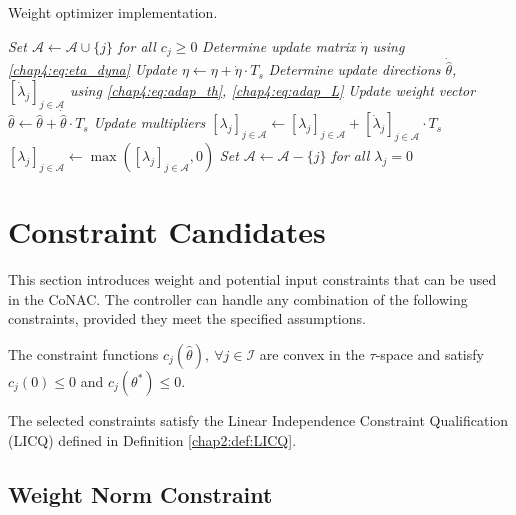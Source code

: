 \begin{algorithm}[t]
    \caption{Weight optimizer implementation.}\label{chap4:alg:alg1}
        \BlankLine
        \emph{Set $\mathcal A \leftarrow \mathcal A\cup \{j\}$ for all $c_j\ge0$}\;
        \emph{Determine update matrix $\dot\eta$ using \eqref{chap4:eq:eta_dyna}}\;
        \emph{Update $\eta\leftarrow \eta +\dot\eta\cdot T_s$}\; 
        \emph{Determine update directions $\dot{\hat\theta}$, $[\dot\lambda_j]_{j\in\mathcal A}$ using \eqref{chap4:eq:adap_th}, \eqref{chap4:eq:adap_L}}\;
        \emph{Update weight vector $\hat\theta\leftarrow \hat\theta+\dot{\hat\theta}\cdot T_s$}\;
        \emph{Update multipliers $[\lambda_j]_{j\in\mathcal A}\leftarrow [\lambda_j]_{j\in\mathcal A}+[\dot\lambda_j]_{j\in\mathcal A}\cdot T_s$}\;
        \emph{$[\lambda_j]_{j\in\mathcal A}\leftarrow \max([\lambda_j]_{j\in\mathcal A}, 0)$}\;
        \emph{Set $\mathcal A \leftarrow \mathcal A - \{j\}$ for all $\lambda_j=0$}\;
\end{algorithm}

\section{Constraint Candidates} \label{chap4:sec:cstr_candidates}

This section introduces weight and potential input constraints that can be used in the CoNAC. 
The controller can handle any combination of the following constraints, provided they meet the specified assumptions.

\begin{assumption}
    The constraint functions $c_j(\hat\theta),\ \forall j\in\mathcal I$ are convex in the $\tau$-space and satisfy $c_j(0) \le 0$ and $c_j(\theta^*)\le 0$.
    \label{chap4:assum:assum1}
\end{assumption}

\begin{assumption}
    The selected constraints satisfy the Linear Independence Constraint Qualification (LICQ) defined in Definition \ref{chap2:def:LICQ}.
    \label{chap4:assum:assum2}
\end{assumption}

\subsection{Weight Norm Constraint} \label{chap4:sec:weight_cstr}

